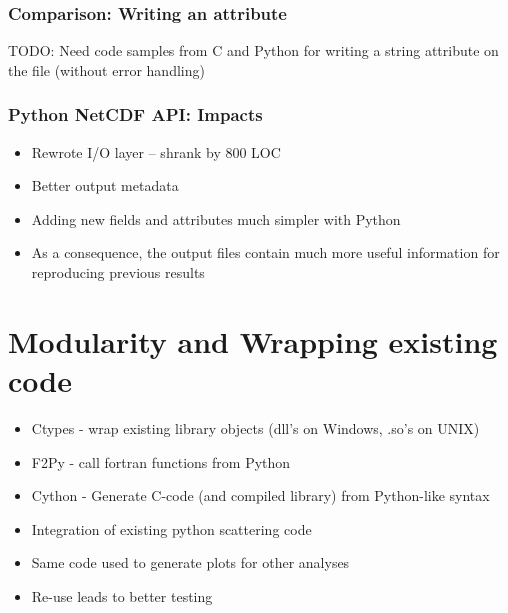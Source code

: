\documentclass[red, hyperref={pdfpagelabels=false}]{beamer}
\begin{document}
\begin{frame}
  \frametitle{Comparison: Writing an attribute}
  TODO: Need code samples from C and Python for writing a string attribute on the file (without error handling)
\end{frame}

\begin{frame}
  \frametitle{Python NetCDF API: Impacts}
  \begin{itemize}
    \item Rewrote I/O layer -- shrank by 800 LOC
    \item Better output metadata
    \item Adding new fields and attributes much simpler with Python
    \item As a consequence, the output files contain much more useful
      information for reproducing previous results
  \end{itemize}
\end{frame}

\section[Modularity]{Modularity and Wrapping existing code}
\begin{frame}
  \begin{itemize}
    \item<1-> \alert<2->{Ctypes} - wrap existing library objects (dll's on Windows, .so's on UNIX)
    \item<1-> \alert<2->{F2Py} - call fortran functions from Python
    \item<1-> Cython - Generate C-code (and compiled library) from Python-like syntax
  \end{itemize}
\end{frame}

\begin{frame}
  \begin{itemize}
    \item Integration of existing python scattering code
    \item Same code used to generate plots for other analyses
    \item Re-use leads to better testing
  \end{itemize}
\end{frame}
\end{document}
